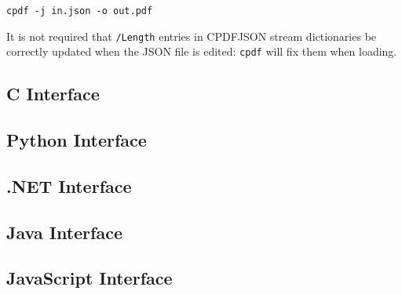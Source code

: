 \documentclass{book}
\begin{document}
  \begin{framed}
  \small\noindent\verb!cpdf -j in.json -o out.pdf!
  \end{framed}

It is not required that \texttt{/Length} entries in CPDFJSON stream dictionaries be correctly updated when the JSON file is edited: \texttt{cpdf} will fix them when loading.

\begin{cpdflib}
\clearpage
\section*{C Interface}
\begin{small}\tt

\end{small}
\end{cpdflib}

\begin{pycpdflib}
\clearpage
\section*{Python Interface}
\begin{small}\tt

\end{small}
\end{pycpdflib}

\begin{dotnetcpdflib}
\clearpage
\section*{.NET Interface}
\begin{small}\tt

\end{small}
\end{dotnetcpdflib}

\begin{jcpdflib}
\clearpage
\section*{Java Interface}
\begin{small}\tt

\end{small}
\end{jcpdflib}

\begin{jscpdflib}
\clearpage
\section*{JavaScript Interface}
\begin{small}\tt

\end{small}
\end{jscpdflib}
\end{document}
